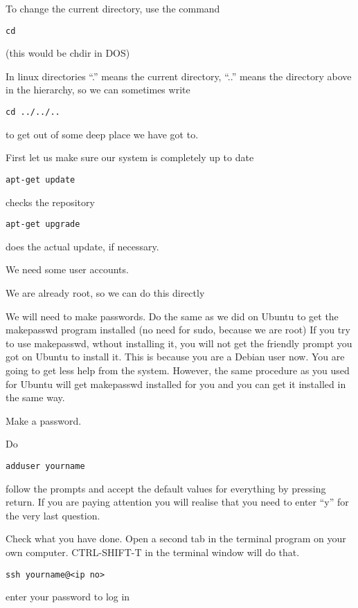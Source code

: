 \documentclass[12pt,a4paper]{article}
\begin{document}
To change the current directory, use the command 
\begin{lstlisting}
cd
\end{lstlisting}
(this would be chdir in DOS)

In linux directories “.” means the current directory, “..” means the directory above in the hierarchy, so we can sometimes write
\begin{lstlisting}
cd ../../..
\end{lstlisting}

to get out of some deep place we have got to.

First let us make sure our system is completely up to date
\begin{lstlisting}
apt-get update
\end{lstlisting}
checks the repository
\begin{lstlisting}
apt-get upgrade
\end{lstlisting}
does the actual update, if necessary.

We need some user accounts.

We are already root, so we can do this directly

We will need to make passwords. Do the same as we did on Ubuntu to get the makepasswd program installed (no need for sudo, because we are root)
If you try to use makepasswd, wthout installing it, you will not get the friendly prompt you got on Ubuntu to install it. This is because you are a Debian user now.  You are going to get less help from the system. However, the same procedure as you used for Ubuntu will get makepasswd installed for you and you can get it installed in the same way.

Make a password.

Do
\begin{lstlisting}
adduser yourname
\end{lstlisting}

follow the prompts and accept the default values for everything by pressing return. If you are paying attention you will realise that you need to enter “y” for the very last question.

Check what you have done. Open a second tab in the terminal program on your own computer. CTRL-SHIFT-T in the terminal window will do that.
\begin{lstlisting}
ssh yourname@<ip no>
\end{lstlisting}
enter your password to log in
\end{document}
